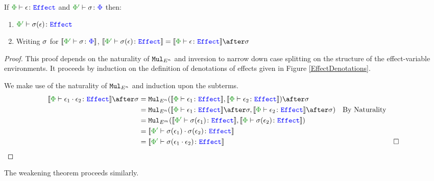 \documentclass{Report}
\begin{document}
\begin{framed}
    \begin{theorem}\label{EffectSubstitutionOnEffects} 
        If $\wellformedeffect{\P}{\e}$ and $\typerelation{\P'}{\si}{\P}$ then: 
        \begin{enumerate}[label=\roman*.]
            \item $\wellformedeffect{\P'}{\si(\e)}$
            \item Writing $\sigma$ for $\deno{\typerelation{\P'}{\si}{\P}}$,  $\deno{\wellformedeffect{\P'}{\si(\e)}} = \deno{\wellformedeffect{\P}{\e}}\after\si$
        \end{enumerate}
          
    \end{theorem}
    
    \begin{proof}
        This proof depends on the naturality of $\texttt{Mul}_{E^n}$ and inversion to narrow down case splitting on the structure of the effect-variable environments. It proceeds by induction on the definition of denotations of effects given in Figure \ref{EffectDenotations}.
    
    \case{\ecompose}
    
    We make use of the naturality of $\texttt{Mul}_{E^n}$ and induction upon the subterms.
    \begin{align*}
        \deno{\typerelation{\P}{\e_1\dot\e_2}{\effect}} \after\si &=
        \Mul_{E^n}(\deno{\typerelation{\P}{\e_1}{\effect}}, \deno{\typerelation{\P}{\e_2}{\effect}})\after \si \\
        & = \Mul_{E^n}(\deno{\typerelation{\P}{\e_1}{\effect}}\after \si, \deno{\typerelation{\P}{\e_2}{\effect}}\after \si)\qt{By Naturality}\\
        & = \Mul_{E^m}(\deno{\typerelation{\P'}{\si(\e_1)}{\effect}}, \deno{\typerelation{\P}{\si(\e_2)}{\effect}})\\
        & = \deno{\typerelation{\P'}{\si(\e_1)\dot\si(\e_2)}{\effect}}\\
        & = \deno{\typerelation{\P'}{\si(\e_1\dot\e_2)}{\effect}}&\square
    \end{align*}   
    \end{proof}
\end{framed}

The weakening theorem proceeds similarly.
\end{document}
